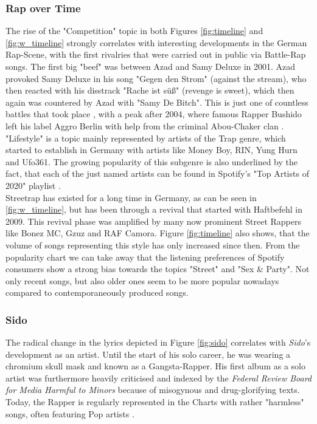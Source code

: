 \documentclass[conference]{IEEEtran}
\begin{document}
\subsubsection{Rap over Time} \label{discussion_timeline}
The rise of the "Competition" topic in both Figures \ref{fig:timeline} and \ref{fig:w_timeline} strongly correlates with interesting developments in the German Rap-Scene, with the first rivalries that were carried out in public via Battle-Rap songs. The first big "beef" was between Azad and Samy Deluxe in 2001. Azad provoked Samy Deluxe in his song "Gegen den Strom" (against the stream), who then reacted with his disstrack "Rache ist süß" (revenge is sweet), which then again was countered by Azad with "Samy De Bitch". This is just one of countless battles that took place \cite{battles}, with a peak after 2004, where famous Rapper Bushido left his label Aggro Berlin with help from the criminal Abou-Chaker clan \cite{abou-chaker}.\\
"Lifestyle" is a topic mainly represented by artists of the Trap genre, which started to establish in Germany with artists like Money Boy, RIN, Yung Hurn and Ufo361. The growing popularity of this subgenre is also underlined by the fact, that each of the just named artists can be found in Spotify's "Top Artists of 2020" playlist \cite{spotify_2020}.\\
Streetrap has existed for a long time in Germany, as can be seen in \ref{fig:w_timeline}, but has been through a revival that started with Haftbefehl in 2009. This revival phase was amplified by many now prominent Street Rappers like Bonez MC, Gzuz and RAF Camora\cite{strassenrap}. Figure \ref{fig:timeline} also shows, that the volume of songs representing this style has only increased since then. From the popularity chart we can take away that the listening preferences of Spotify consumers show a strong bias towards the topics "Street" and "Sex \& Party". Not only recent songs, but also older ones seem to be more popular nowadays compared to contemporaneously produced songs.

\subsubsection{Sido}
The radical change in the lyrics depicted in Figure \ref{fig:sido} correlates with \textit{Sido}'s development as an artist. Until the start of his solo career, he was wearing a chromium skull mask and known as a Gangsta-Rapper. His first album as a solo artist was furthermore heavily criticised and indexed \cite{urteil} by the \textit{Federal Review Board for Media Harmful to Minors} \cite{bpjm} because of misogynous and drug-glorifying texts. Today, the Rapper is regularly represented in the Charts with rather "harmless" songs, often featuring Pop artists \cite{sido_charts}.
\end{document}

